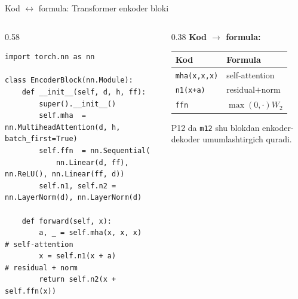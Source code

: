 \documentclass[aspectratio=169,11pt]{beamer}
\begin{document}
\begin{frame}[fragile]{Kod $\leftrightarrow$ formula: Transformer enkoder bloki}
  \begin{columns}[T]
    \begin{column}{0.58\textwidth}
\begin{lstlisting}
import torch.nn as nn

class EncoderBlock(nn.Module):
    def __init__(self, d, h, ff):
        super().__init__()
        self.mha  = nn.MultiheadAttention(d, h, batch_first=True)
        self.ffn  = nn.Sequential(
            nn.Linear(d, ff), nn.ReLU(), nn.Linear(ff, d))
        self.n1, self.n2 = nn.LayerNorm(d), nn.LayerNorm(d)

    def forward(self, x):
        a, _ = self.mha(x, x, x)     # self-attention
        x = self.n1(x + a)           # residual + norm
        return self.n2(x + self.ffn(x))
\end{lstlisting}
    \end{column}
    \begin{column}{0.38\textwidth}
      \textbf{Kod $\to$ formula:}\\[3pt]
      \footnotesize
      \begin{tabular}{p{1.7cm}p{2.0cm}}
        \toprule
        Kod & Formula \\
        \midrule
        \texttt{mha(x,x,x)} & self-attention \\
        \texttt{n1(x+a)} & residual$+$norm \\
        \texttt{ffn} & $\max(0,\cdot)W_2$ \\
        \bottomrule
      \end{tabular}
      \vspace{4pt}
      \begin{tcolorbox}[okbox,top=2pt,bottom=2pt]
        \footnotesize
        P12 da \texttt{m12} shu blokdan enkoder-dekoder umumlashtirgich quradi.
      \end{tcolorbox}
    \end{column}
  \end{columns}
\end{frame}
\end{document}
